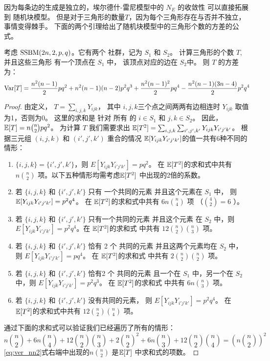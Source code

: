 因为每条边的生成是独立的，埃尔德什-雷尼模型中的
$N_E$ 的收敛性 %
可以直接拓展到
随机块模型。
但是对于三角形的数量$T$，因为每个三角形存在与否并不独立，事情变得棘手。
下面的两个引理给出了随机块模型中的三角形个数的方差的公式。
\begin{lemma}\label{lem:SBM_tr_counting_cross}
	考虑 $\operatorname{SSBM}(2n, 2, p, q)$。它有两个
  社群，记为 $S_1$ 和 $S_2$。
    计算三角形的个数 $T$, 并且这些三角形
    有一个顶点在  $S_1$ 中，
    该顶点对应的边在 $S_2$中。
   则 $T$ 的方差为：
\begin{align}
\operatorname{\mathrm{Var}}[T]  = \frac{n^2(n-1)}{2}pq^2 + n^2(n-1)(n-2)p^2q^3 
 + \frac{n^2(n-1)^2}{2}pq^4 - \frac{n^2(n-1)(3n-4)}{2} p^2 q^4
 \label{eq:SBM_tr_counting_cross}
\end{align}
\end{lemma}
\begin{proof}
	由定义， $T=\sum_{i,j,k} Y_{ijk}$，
  其中 $i,j,k$三个点之间两两有边相连时 $Y_{ijk}$ 取值为1，否则为0。
  这里的求和是
  针对 所有 的 $i \in S_1$ 和 $j,k \in S_2$。
  因此， $\operatorname{\mathbb{E}}[T] = n\binom{n}{2}pq^2$。
	为计算 $T$ 我们需要求出 $\operatorname{\mathbb{E}}[T^2] = \sum_{i,j,k}\sum_{i',j',k'} Y_{ijk}Y_{i'j'k'}$。
	根据三元组 $(i,j,k)$ 和 $(i',j',k')$ 重合的情况
  $\operatorname{\mathbb{E}}[Y_{ijk}Y_{i'j'k'}]$的值一共有6种不同的情形：
	\begin{enumerate}
		\item $\{i,j,k\} = \{i',j',k'\}$，则 $E[Y_{ijk}Y_{i'j'k'}] = pq^2$。
		在 $\operatorname{\mathbb{E}}[T^2]$的求和式中共有 $n\binom{n}{2}$ 
     项。以下五种情形均需考虑$\operatorname{\mathbb{E}}[T^2]$ 中出现的2倍的系数。
		\item 若 $\{i,j,k\}$ 和 $\{i',j',k'\}$ 只有
    一个共同的元素
    并且这个元素在 $ S_1$ 中， 则 $\operatorname{\mathbb{E}}[Y_{ijk}Y_{i'j'k'}] = p^2q^4$。
		在 $\operatorname{\mathbb{E}}[T^2]$的求和式中共有 $6n\binom{n}{4}$ 项 （$\binom{4}{2}=6$ ）。
		\item 若 $\{i,j,k\}$ 和 $\{i',j',k'\}$ 只有一个共同的元素
    并且这个元素 在 $ S_2$ 中，则
    $E[Y_{ijk}Y_{i'j'k'}] = p^2q^4$。在 $\operatorname{\mathbb{E}}[T^2]$的求和式
		中共有 $12\binom{n}{2}\binom{n}{3}$ 项。
		\item 若 $\{i,j,k\}$ 和 $\{i',j',k'\}$ 恰有 2  个 共同的元素
    并且这两个元素均在 $S_2$ 中，
    则 $E[Y_{ijk}Y_{i'j'k'}] = pq^4$。
    在 $\operatorname{\mathbb{E}}[T^2]$的求和式
		中共有  $2\binom{n}{2}\binom{n}{2}$ 项。
\item 若 $\{i,j,k\}$ 和 $\{i',j',k'\}$ 恰有2  个 共同的元素
且一个在 $S_1$ 中，另一个在 $S_2$ 中，则 $E[Y_{ijk}Y_{i'j'k'}] = p^2q^3$。
在 $\operatorname{\mathbb{E}}[T^2]$的求和式
		中共有 $6n\binom{n}{3}$ 项。
\item  若 $\{i,j,k\}$ 和 $\{i',j',k'\}$ 没有共同的元素，
 则 $E[Y_{ijk}Y_{i'j'k'}] = p^2q^4$。
 在 $\operatorname{\mathbb{E}}[T^2]$的求和式中共有 $12\binom{n}{2}\binom{n}{4}$ 
 项。
	\end{enumerate}
通过下面的求和式可以验证我们已经遍历了所有的情形：
\begin{equation}\label{eq:ver_nn2}
  n\binom{n}{2} + 6n\binom{n}{4} + 12\binom{n}{2} \binom{n}{3} + 2\binom{n}{2}^2 + 6n\binom{n}{3} + 12\binom{n}{2}\binom{n}{4} = \left(n\binom{n}{2}\right)^2  
\end{equation}
\eqref{eq:ver_nn2}式右端中出现的$n\binom{n}{2}$ 是$\operatorname{\mathbb{E}}[T] $ 中求和式的项数。
\end{proof}
